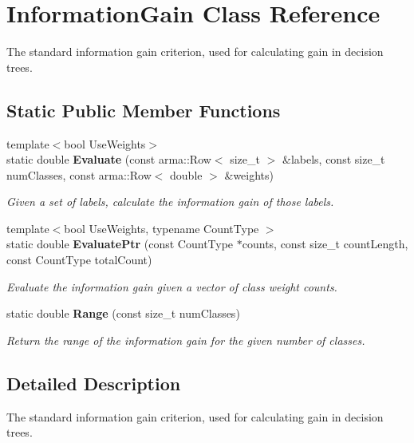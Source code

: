 \section{Information\+Gain Class Reference}
\label{classmlpack_1_1tree_1_1InformationGain}


The standard information gain criterion, used for calculating gain in decision trees.  


\subsection*{Static Public Member Functions}
\begin{DoxyCompactItemize}
\item 
{\footnotesize template$<$bool Use\+Weights$>$ }\\static double \textbf{ Evaluate} (const arma\+::\+Row$<$ size\+\_\+t $>$ \&labels, const size\+\_\+t num\+Classes, const arma\+::\+Row$<$ double $>$ \&weights)
\begin{DoxyCompactList}\small\item\em Given a set of labels, calculate the information gain of those labels. \end{DoxyCompactList}\item 
{\footnotesize template$<$bool Use\+Weights, typename Count\+Type $>$ }\\static double \textbf{ Evaluate\+Ptr} (const Count\+Type $\ast$counts, const size\+\_\+t count\+Length, const Count\+Type total\+Count)
\begin{DoxyCompactList}\small\item\em Evaluate the information gain given a vector of class weight counts. \end{DoxyCompactList}\item 
static double \textbf{ Range} (const size\+\_\+t num\+Classes)
\begin{DoxyCompactList}\small\item\em Return the range of the information gain for the given number of classes. \end{DoxyCompactList}\end{DoxyCompactItemize}


\subsection{Detailed Description}
The standard information gain criterion, used for calculating gain in decision trees. 

